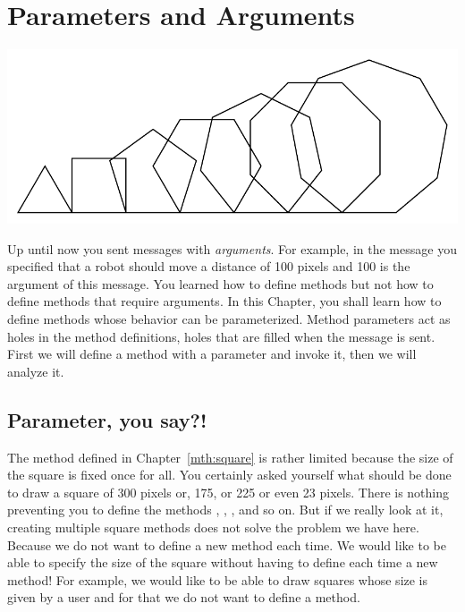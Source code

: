 \ifx\wholebook\relax\else



\fi


\chapter{Parameters and Arguments}\label{ch:argumenting}

\begin{chapterfigure}
\includegraphics[width=0.9\linewidth]{ArgumentTitle}
\end{chapterfigure}

Up until now you sent messages with \emph{arguments}. For example, in the message  you specified that a robot should move a distance of 100 pixels and 100 is the argument of this message. You learned how to define methods but not how to define methods that require arguments. In this Chapter, you shall learn how to define methods whose behavior can be parameterized. Method parameters act as holes in the method definitions, holes that are filled when the message is sent.  First we will define a method with a parameter and invoke it, then we will analyze it.


\section{Parameter, you say?!}
The method  defined in Chapter~\ref{mth:square} is
rather limited because the size of the square is fixed once for all. You certainly asked yourself what should be done to draw a square of 300 pixels or, 175, or 225 or even 23 pixels.  There is nothing preventing you to define the methods , , ,  and so on. But if we really look at it, creating multiple square methods does not solve the problem we have here. Because we do not want to define a new method each time. We would like to be able to specify the size of the square without having to define each time a new method!
For example, we would like to be able to draw squares whose size is given by a user and for that we do not want to define a method.


